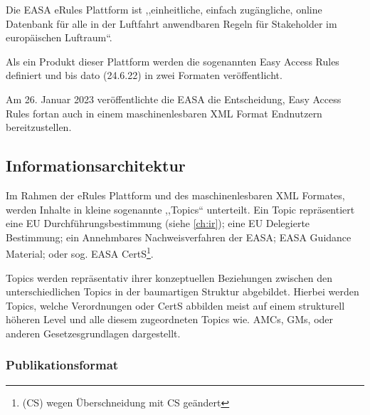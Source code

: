     Die \ac{EASA} eRules Plattform ist ,,einheitliche, einfach zugängliche, online Datenbank für alle in der Luftfahrt anwendbaren Regeln für Stakeholder im europäischen Luftraum``.
    \cite[5]{easa_xml_doc}

    Als ein Produkt dieser Plattform werden die sogenannten Easy Access Rules definiert und bis dato (24.6.22) in zwei Formaten veröffentlicht. 

    
Am 26. Januar 2023 veröffentlichte die EASA die Entscheidung, Easy Access Rules fortan auch in einem maschinenlesbaren XML Format Endnutzern bereitzustellen. \cite{easa_xml_publication}


\subsection{Informationsarchitektur}
\label{ch:easa_arch}

    Im Rahmen der eRules Plattform und des maschinenlesbaren \ac{XML} Formates, werden Inhalte in kleine sogenannte ,,Topics`` unterteilt.
    Ein Topic repräsentiert eine \ac{EU} Durchführungsbestimmung (siehe \ref{ch:ir}); eine \ac{EU} Delegierte Bestimmung; ein Annehmbares Nachweisverfahren der \ac{EASA}; \ac{EASA} Guidance Material; oder sog. \ac{EASA} \acf{CertS}\footnote{(CS) wegen Überschneidung mit \acf{CS} geändert}. \cite[S. 5f]{easa_xml_doc}
    
Topics werden repräsentativ ihrer konzeptuellen Beziehungen zwischen den unterschiedlichen Topics in der baumartigen Struktur abgebildet.
Hierbei werden Topics, welche Verordnungen oder \ac{CertS} abbilden meist auf einem strukturell höheren Level und alle diesem zugeordneten Topics wie. \acsp{AMC}, \acsp{GM}, oder anderen Gesetzesgrundlagen dargestellt.

        
        \subsubsection{Publikationsformat}

